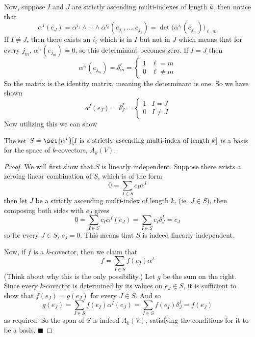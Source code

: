 \documentclass[10pt]{article}
\def\qed{%
    \ifmmode%
        \eqno\blacksquare%
    \else%
        \hskip1cm\allowbreak\hbox{}\nobreak\hfill$\blacksquare$%
    \fi%
}
\begin{document}
Now, suppose $I$ and $J$ are strictly ascending multi-indexes of length $k$, then notice that
\[ \alpha^I(e_J) = \alpha^{i_1}\wedge\cdots\wedge\alpha^{i_k}(e_{j_1},\dots,e_{j_k}) = \det\bigl(\alpha^{i_\ell}(e_{j_m})\bigr)_{\ell,m} \]
If $I\neq J$, then there exists an $i_\ell$ which is in $I$ but not in $J$ which means that for every $j_m$, $\alpha^{i_\ell}(e_{j_m})=0$, so this determinant becomes zero.
If $I=J$ then
\[ \alpha^{i_\ell}(e_{j_m})=\delta^\ell_m=\begin{cases} 1 & \ell = m \\ 0 & \ell \neq m \end{cases} \]
So the matrix is the identity matrix, meaning the determinant is one.
So we have shown
\[ \alpha^I(e_J) = \delta^I_J = \begin{cases} 1 & I=J \\ 0 & I\neq J \end{cases} \]
Now utilizing this we can show

\begin{thrm*}

    The set $S=\set{\alpha^I}[I\text{ is a strictly ascending multi-index of length $k$}]$ is a basis for the space of $k$-covectors, $A_k(V)$.

\end{thrm*}

\begin{proof}

    We will first show that $S$ is linearly independent.
    Suppose there exists a zeroing linear combination of $S$, which is of the form
    \[ 0 = \sum_{I\in S}c_I\alpha^I \]
    then let $J$ be a strictly ascending multi-index of length $k$, (ie. $J\in S$), then composing both sides with $e_J$ gives
    \[ 0 = \sum_{I\in S}c_I\alpha^I(e_J) = \sum_{I\in S}c_I\delta^I_J = c_J \]
    so for every $J\in S$, $c_J=0$.
    This means that $S$ is indeed linearly independent.

    Now, if $f$ is a $k$-covector, then we claim that
    \[ f = \sum_{I\in S}f(e_I)\alpha^I \]
    (Think about why this is the only possibility.)
    Let $g$ be the sum on the right.
    Since every $k$-covector is determined by its values on $e_J\in S$, it is sufficient to show that $f(e_J)=g(e_J)$ for every $J\in S$.
    And so
    \[ g(e_J) = \sum_{I\in S}f(e_I)\alpha^I(e_J) = \sum_{I\in S}f(e_I)\delta^I_J = f(e_J) \]
    as required.
    So the span of $S$ is indeed $A_k(V)$, satisfying the conditions for it to be a basis.
    \qed

\end{proof}
\end{document}
